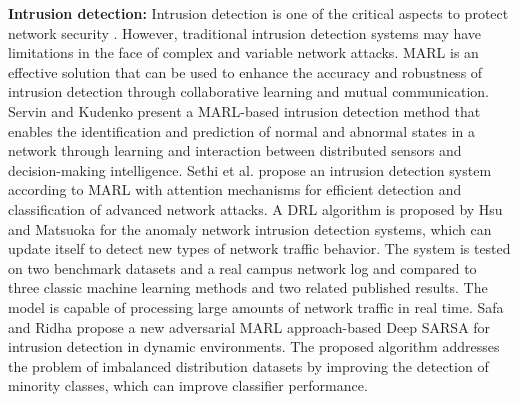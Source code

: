 \documentclass[acmsmall]{acmart}
\begin{document}
\textbf{Intrusion detection: } 
Intrusion detection is one of the critical aspects to protect network security \cite{9705079}. However, traditional intrusion detection systems may have limitations in the face of complex and variable network attacks. MARL is an effective solution that can be used to enhance the accuracy and robustness of intrusion detection through collaborative learning and mutual communication.
Servin and Kudenko \cite{10.1007/978-3-540-87805-6_15} present a MARL-based intrusion detection method that enables the identification and prediction of normal and abnormal states in a network through learning and interaction between distributed sensors and decision-making intelligence.
Sethi et al. \cite{SETHI2021102923} propose an intrusion detection system according to MARL with attention mechanisms for efficient detection and classification of advanced network attacks. 
A DRL algorithm is proposed by Hsu and Matsuoka \cite{9335796} for the anomaly network intrusion detection systems, which can update itself to detect new types of network traffic behavior. The system is tested on two benchmark datasets and a real campus network log and compared to three classic machine learning methods and two related published results. The model is capable of processing large amounts of network traffic in real time.
Safa and Ridha \cite{mohamed2021adversarial} propose a new adversarial MARL approach-based Deep SARSA \cite{kuzmin2002connectionist} for intrusion detection in dynamic environments. The proposed algorithm addresses the problem of imbalanced distribution datasets by improving the detection of minority classes, which can improve classifier performance.
\end{document}
